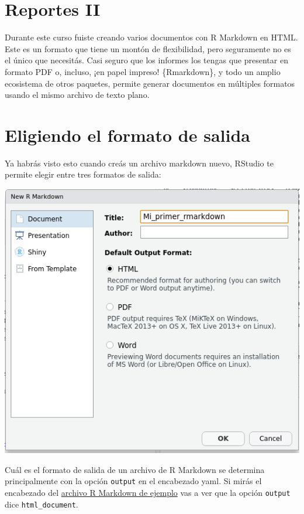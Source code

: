 \documentclass[
  openany]{book}
\begin{document}
\hypertarget{reportes-ii}{%
\section{Reportes II}\label{reportes-ii}}

Durante este curso fuiste creando varios documentos con R Markdown en HTML. Este es un formato que tiene un montón de flexibilidad, pero seguramente no es el único que necesitás. Casi seguro que los informes los tengas que presentar en formato PDF o, incluso, ¡en papel impreso! \{Rmarkdown\}, y todo un amplio ecosistema de otros paquetes, permite generar documentos en múltiples formatos usando el mismo archivo de texto plano.

\hypertarget{eligiendo-el-formato-de-salida}{%
\section{Eligiendo el formato de salida}\label{eligiendo-el-formato-de-salida}}

Ya habrás visto esto cuando creás un archivo markdown nuevo, RStudio te permite elegir entre tres formatos de salida:

\includegraphics{img/nuevo-rmd.png}

Cuál es el formato de salida de un archivo de R Markdown se determina principalmente con la opción \texttt{output} en el encabezado yaml. Si mirás el encabezado del \href{files/mi-primer-rmarkdown.Rmd}{archivo R Markdown de ejemplo} vas a ver que la opción \texttt{output} dice \texttt{html\_document}.
\end{document}
